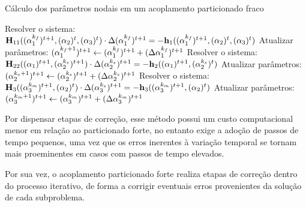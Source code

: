 \documentclass[_ArquivoPrincipal.tex]{subfiles}
\begin{document}
\begin{algorithm}[h!]
    \caption{Cálculo dos parâmetros nodais em um acoplamento particionado fraco}
    \label{alg:PartFraco}
    Resolver o sistema: $\mathbf{H}_{11}((\mathbf{\alpha}_1^{k_f})^{t+1},(\mathbf{\alpha}_2)^t,(\mathbf{\alpha}_3)^t)\cdot\Delta(\mathbf{\alpha}_1^{k_f})^{t+1}=-\mathbf{h}_1((\mathbf{\alpha}_1^{k_f})^{t+1},(\mathbf{\alpha}_2)^t,(\mathbf{\alpha}_3)^t)$\;
    Atualizar parâmetros: $(\mathbf{\alpha}_1^{k_f+1})^{t+1}\gets(\mathbf{\alpha}_1^{k_f})^{t+1}+(\Delta\mathbf{\alpha}_1^{k_f})^{t+1}$\;
    Resolver o sistema: $\mathbf{H}_{22}((\mathbf{\alpha}_1)^{t+1},(\mathbf{\alpha}_2^{k_s})^{t+1})\cdot\Delta(\mathbf{\alpha}_2^{k_s})^{t+1}=-\mathbf{h}_2((\mathbf{\alpha}_1)^{t+1},(\mathbf{\alpha}_2^{k_s})^t)$\;
    Atualizar parâmetros: $(\mathbf{\alpha}_2^{k_s+1})^{t+1}\gets(\mathbf{\alpha}_2^{k_s})^{t+1}+(\Delta\mathbf{\alpha}_2^{k_s})^{t+1}$\;
    Resolver o sistema: $\mathbf{H}_{3}((\mathbf{\alpha}_3^{k_m})^{t+1},(\mathbf{\alpha}_2)^t)\cdot\Delta(\mathbf{\alpha}_3^{k_s})^{t+1}=-\mathbf{h}_3((\mathbf{\alpha}_3^{k_m})^{t+1},(\mathbf{\alpha}_2)^t)$\;
    Atualizar parâmetros: $(\mathbf{\alpha}_3^{k_m+1})^{t+1}\gets(\mathbf{\alpha}_3^{k_m})^{t+1}+(\Delta\mathbf{\alpha}_3^{k_m})^{t+1}$\;
\end{algorithm}

Por dispensar etapas de correção, esse método possui um custo computacional menor em relação ao particionado forte, no entanto exige a adoção de passos de tempo pequenos, uma vez que os erros inerentes à variação temporal se tornam mais proeminentes em casos com passos de tempo elevados.

Por sua vez, o acoplamento particionado forte realiza etapas de correção dentro do processo iterativo, de forma a corrigir eventuais erros provenientes da solução de cada subproblema.
\end{document}
